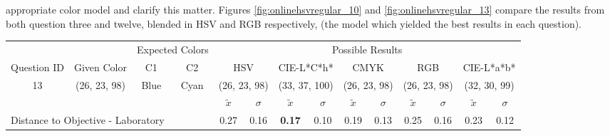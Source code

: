 appropriate color model and clarify this matter. Figures \ref{fig:onlinehsvregular_10} and \ref{fig:onlinehsvregular_13} compare the results from both question three and twelve, blended in HSV and RGB respectively,
(the model which yielded the best results in each question). \par
%
\begin{table}[H]
  \resizebox{\textwidth}{!} {
  \begin{tabular}{lccccccccccccc}
    \hline
    \multicolumn{1}{c}{}                              &                                      & \multicolumn{2}{c}{Expected Colors}                   & \multicolumn{10}{c}{Possible Results}                                                                                                                                                                                                                                                                                        \\ \cline{3-14}
    \multicolumn{1}{c}{\multirow{-2}{*}{Question ID}} & \multirow{-2}{*}{Given Color}        & C1                       & C2                         & \multicolumn{2}{c}{HSV}                                        & \multicolumn{2}{c}{CIE-L*C*h*}                                 & \multicolumn{2}{c}{CMYK}                                       & \multicolumn{2}{c}{RGB}                                        & \multicolumn{2}{c}{CIE-L*a*b*}                                 \\ \hline
    \multicolumn{1}{c}{13}                             & \cellcolor[HTML]{0080FF}(26, 23, 98) & \multicolumn{1}{c|}{Blue} & \multicolumn{1}{c|}{Cyan}  & \multicolumn{2}{c|}{\cellcolor[HTML]{0080FF}(26, 23, 98)}      & \multicolumn{2}{c|}{\cellcolor[HTML]{00ACFF}(33, 37, 100)}       & \multicolumn{2}{c|}{\cellcolor[HTML]{0080FF}(26, 23, 98)}       & \multicolumn{2}{c|}{\cellcolor[HTML]{0080FF}(26, 23, 98)}       & \multicolumn{2}{c|}{\cellcolor[HTML]{5792FF}(32, 30, 99)}       \\ \hline
                                                      & \multicolumn{1}{l}{}                 & \multicolumn{1}{l}{}     & \multicolumn{1}{l}{}       & \multicolumn{1}{c}{$\tilde{x}$} & \multicolumn{1}{c}{$\sigma$} & \multicolumn{1}{c}{$\tilde{x}$} & \multicolumn{1}{c}{$\sigma$} & \multicolumn{1}{c}{$\tilde{x}$} & \multicolumn{1}{c}{$\sigma$} & \multicolumn{1}{c}{$\tilde{x}$} & \multicolumn{1}{c}{$\sigma$} & \multicolumn{1}{c}{$\tilde{x}$} & \multicolumn{1}{c}{$\sigma$} \\ \hline
    \multicolumn{4}{l}{Distance to Objective - Laboratory}                                                                                           & \multicolumn{1}{|c}{0.27}       & \multicolumn{1}{c|}{0.16}    & \multicolumn{1}{|c}{\textbf{0.17}}       & \multicolumn{1}{c|}{0.10}    & \multicolumn{1}{|c}{0.19}       & \multicolumn{1}{c|}{0.13}    & \multicolumn{1}{|c}{0.25}       & \multicolumn{1}{c|}{0.16}    & \multicolumn{1}{|c}{0.23}       & \multicolumn{1}{c|}{0.12}    \\

\end{tabular}}
\end{table}
